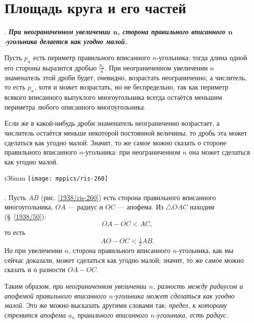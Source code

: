 

\section{Площадь круга и его частей}

\paragraph{}\label{1938/262}
.
\textbf{\emph{При неограниченном увеличении $\bm{n}$, сторона правильного вписанного $\bm{n}$-угольника делается как угодно малой.}}

Пусть $p_n$ есть периметр правильного вписанного $n$-угольника;
тогда длина одной его стороны выразится дробью $\frac {p_n}n$.
При неограниченном увеличении $n$ знаменатель этой дроби будет, очевидно, возрастать неограниченно, а числитель, то есть $p_n$, хотя и может возрастать, но не беспредельно,
так как периметр всякого вписанного выпуклого многоугольника всегда остаётся меньшим периметра любого описанного многоугольника.

Если же в какой-нибудь дроби знаменатель неограниченно возрастает, а числитель остаётся меньше некоторой постоянной величины, то дробь эта может сделаться как угодно малой.
Значит, то же самое можно сказать о стороне правильного вписанного $n$-угольника:
при неограниченном $n$ она может сделаться как угодно малой.

\begin{wrapfigure}[12]{r}{36mm}
\vskip-8mm
\centering
\texttt{[image: mppics/ris-260]}
\caption{}\label{1938/ris-260}
\end{wrapfigure}

\paragraph{}\label{1938/263}
\mbox{.}
Пусть $AB$ (рис. \ref{1938/ris-260}) есть сторона правильного вписанного многоугольника, $OA$ — радиус и $OC$ — апофема.
Из $\triangle OAC$ находим (§~\ref{1938/50}):
\[OA-OC<AC,\]
то есть
\[AO-OC<\tfrac12 AB.\]
Но при увеличении $n$, сторона правильного вписанного $n$-угольника, как мы сейчас доказали, может сделаться как угодно малой;
значит, то же самое можно сказать и о разности $OA-OC$.



Таким образом, \emph{при неограниченном увеличении $n$, разность между радиусом и апофемой правильного вписанного $n$-угольника может сделаться как угодно малой}.
Это же можно высказать другими словами так: 
\emph{предел, к которому стремится апофема $a_n$ правильного вписанного $n$-угольника, есть радиус.}



